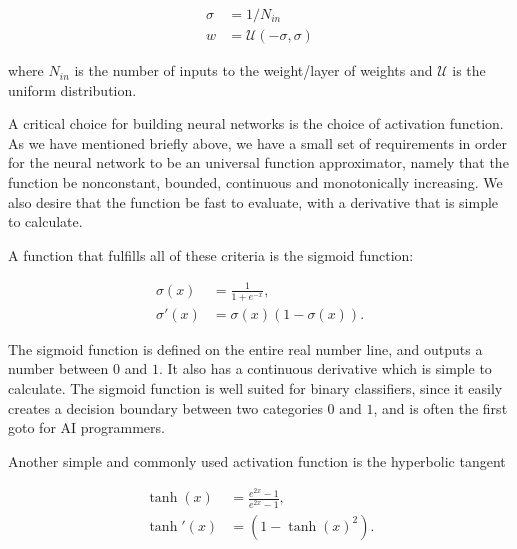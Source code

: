\begin{equation}
    \begin{split}
        \sigma &= 1 / N_{in} \\
        w &= \mathcal{U}(-\sigma, \sigma)
    \end{split}
\end{equation}

where $N_{in}$ is the number of inputs to the weight/layer of weights
and $\mathcal{U}$ is the uniform distribution.
\par
A critical choice for building neural networks is the choice of activation function.
As we have mentioned briefly above, we have a small set of requirements in order
for the neural network to be an universal function approximator, namely
that the function be nonconstant, bounded, continuous and monotonically increasing.
We also desire that the function be fast to evaluate, with a derivative that
is simple to calculate.
\par
A function that fulfills all of these criteria is the sigmoid function:

\begin{equation}
    \begin{split}
        \sigma(x) &= \frac{1}{1 + e^{-x}} , \\
        \sigma '(x) &= \sigma(x)(1 - \sigma(x)) .
    \end{split}
\end{equation}

The sigmoid function is defined on the entire real number line,
and outputs a number between $0$ and $1$. It also has a continuous derivative
which is simple to calculate. The sigmoid function is well suited for binary
classifiers, since it easily creates a decision boundary between two categories
$0$ and $1$, and is often the first goto for AI programmers.
\par
Another simple and commonly used activation function is the hyperbolic tangent

\begin{equation}
    \begin{split}
        \tanh(x) &= \frac{e^{2x} -1}{e^{2x} - 1} , \\
        \tanh '(x) &= (1 - \tanh(x)^2) .
    \end{split}
\end{equation}

